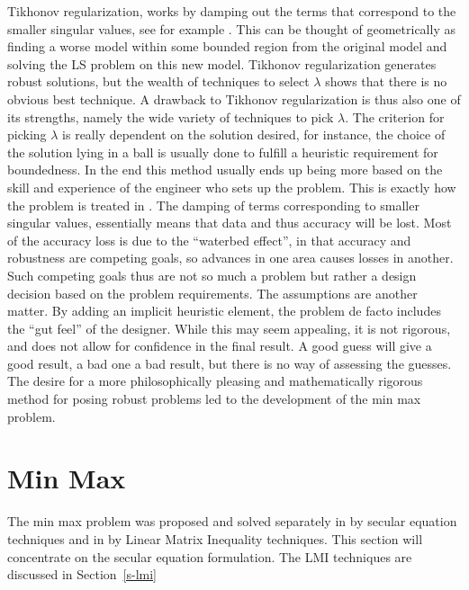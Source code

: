 Tikhonov regularization, works by damping out the terms that correspond to the smaller singular values, see for example .  This can be thought of geometrically as finding a worse model within some bounded region from the original model and solving the LS problem on this new model.  Tikhonov regularization generates robust solutions, but the wealth of techniques to select $\lambda$ shows that there is no obvious best technique.  A drawback to Tikhonov regularization is thus also one of its strengths, namely the wide variety of techniques to pick $\lambda$.  The criterion for picking $\lambda$ is really dependent on the solution desired, for instance, the choice of the solution lying in a ball is usually done to fulfill a heuristic requirement for boundedness.  In the end this method usually ends up being more based on the skill and experience of the engineer who sets up the problem.  This is exactly how the problem is treated in .  The damping of terms corresponding to smaller singular values, essentially means that data and thus accuracy will be lost.  Most of the accuracy loss is due to the ``waterbed effect'', in that accuracy and robustness are competing goals, so advances in one area causes losses in another.  Such competing goals thus are not so much a problem but rather a design decision based on the problem requirements.  The assumptions are another matter.  By adding an implicit heuristic element, the problem de facto includes the ``gut feel'' of the designer.  While this may seem appealing, it is not rigorous, and does not allow for confidence in the final result.  A good guess will give a good result, a bad one a bad result, but there is no way of assessing the guesses.  The desire for a more philosophically pleasing and mathematically rigorous method for posing robust problems led to the development of the min max problem.

\section{Min Max}\label{s-mm}

The min max problem was proposed and solved separately in  by secular equation techniques and in  by Linear Matrix Inequality techniques.  This section will concentrate on the secular equation formulation.  The LMI techniques are discussed in Section~\ref{s-lmi}

